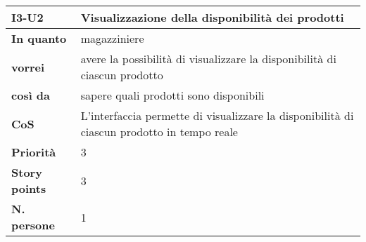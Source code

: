 \begin{table}[H]
  \begin{tabularx}{\textwidth}{lX}
    \toprule
    \textbf{I3-U2} & \textbf{Visualizzazione della disponibilità dei prodotti} \\
    \midrule
    \textbf{In quanto} & magazziniere \\
    \textbf{vorrei} & avere la possibilità di visualizzare la disponibilità di ciascun prodotto \\
    \textbf{così da} & sapere quali prodotti sono disponibili \\
    \midrule
    \textbf{CoS} & L'interfaccia permette di visualizzare la disponibilità di ciascun prodotto in tempo reale \\
    \midrule
    \textbf{Priorità} & 3 \\
    \textbf{Story points} & 3 \\
    \textbf{N. persone} & 1 \\
    \bottomrule
  \end{tabularx}
  \label{user-story:i3-u2}
\end{table}
